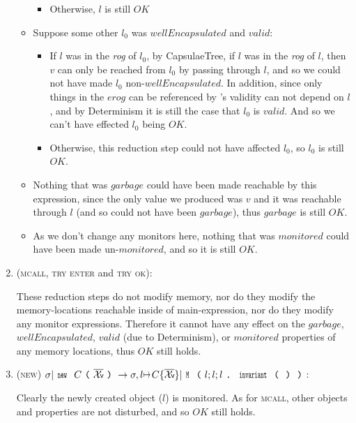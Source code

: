\begin{enumerate}
\begin{itemize}
\begin{itemize}
		    \item Otherwise, $l$ is still $OK$
    	\end{itemize}

	\item Suppose some other $l_0$ was $wellEncapsulated$ and $valid$:
	\begin{itemize}
			\item If $l$ was in the \emph{rog} of $l_0$, by CapsulaeTree, if $l$ was in the \emph{rog} of $l$, then $v$ can only be reached from $l_0$ by passing through $l$, and so we could not have made $l_0$ non-$wellEncapsulated$. In addition, since only things in the $erog$ can be referenced by \Q@invariant@’s validity can not depend on $l$, and by Determinism it is still the case that $l_0$ is $valid$. And so we can’t have effected $l_0$ being $OK$.
			\item Otherwise, this reduction step could not have affected $l_0$, so $l_0$ is still $OK$.
	\end{itemize}


	\item Nothing that was $\mathit{garbage}$ could have been made reachable by this expression, since the only value we produced was $v$ and it was reachable through $l$ (and so could not have been $\mathit{garbage}$), thus $\mathit{garbage}$ is still $OK$.

	\item As we don’t change any monitors here, nothing that was $\mathit{monitored}$ could have been made un-$\mathit{monitored}$, and so it is still $OK$.
\end{itemize}

\item (\textsc{mcall}, \textsc{try enter} and \textsc{try ok}):

	These reduction steps do not modify memory, nor do they modify the memory-locations reachable inside of main-expression, nor do they modify any monitor expressions. Therefore it cannot have any effect on the $\mathit{garbage}$, $wellEncapsulated$, $valid$ (due to Determinism), or $\mathit{monitored}$ properties of any memory locations, thus $\mathit{OK}$ still holds.

\item (\textsc{new}) $\sigma|\Kw{new}\ C\oR\vs\cR\rightarrow \sigma,l\mapsto C\{\vs\}| \Kw{M}\oR l;l;l\singleDot\Kw{invariant}\oR\cR\cR$:

	Clearly the newly created object ($l$) is monitored. As for \textsc{mcall}, other objects and properties are not disturbed, and so $\mathit{OK}$ still holds.



\end{enumerate}
